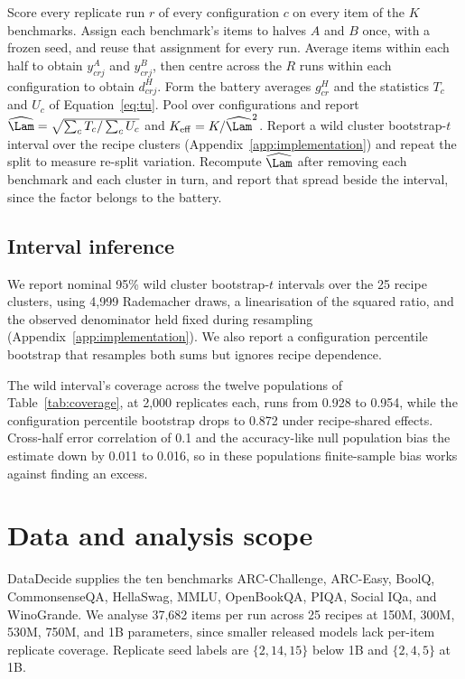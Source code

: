 \begin{algorithm}[t]
\caption{SNAP measurement recipe for a fixed battery of $K$ benchmarks scored on $R$ replicate runs per configuration. The primary analysis used a random frozen split, checked against a passage-aware one, and the pre-specified test kept passage-linked items in one half.}
\label{alg:snap}
\begin{algorithmic}[1]
\STATE Score every replicate run $r$ of every configuration $c$ on every item of the $K$ benchmarks.
\STATE Assign each benchmark's items to halves $A$ and $B$ once, with a frozen seed, and reuse that assignment for every run.
\STATE Average items within each half to obtain $y^A_{crj}$ and $y^B_{crj}$, then centre across the $R$ runs within each configuration to obtain $d^H_{crj}$.
\STATE Form the battery averages $g^H_{cr}$ and the statistics $T_c$ and $U_c$ of Equation~\ref{eq:tu}.
\STATE Pool over configurations and report $\widehat\Lam=\sqrt{\sum_c T_c/\sum_c U_c}$ and $K_{\mathrm{eff}}=K/\widehat\Lam^2$.
\STATE Report a wild cluster bootstrap-$t$ interval over the recipe clusters (Appendix~\ref{app:implementation}) and repeat the split to measure re-split variation.
\STATE Recompute $\widehat\Lam$ after removing each benchmark and each cluster in turn, and report that spread beside the interval, since the factor belongs to the battery.
\end{algorithmic}
\end{algorithm}


\subsection{Interval inference}
We report nominal 95\% wild cluster bootstrap-$t$ intervals over the 25 recipe clusters, using 4,999 Rademacher draws, a linearisation of the squared ratio, and the observed denominator held fixed during resampling (Appendix~\ref{app:implementation}). We also report a configuration percentile bootstrap that resamples both sums but ignores recipe dependence.

The wild interval's coverage across the twelve populations of Table~\ref{tab:coverage}, at 2,000 replicates each, runs from 0.928 to 0.954, while the configuration percentile bootstrap drops to 0.872 under recipe-shared effects. Cross-half error correlation of 0.1 and the accuracy-like null population bias the estimate down by 0.011 to 0.016, so in these populations finite-sample bias works against finding an excess.

\section{Data and analysis scope}
\label{sec:data}
DataDecide supplies the ten benchmarks ARC-Challenge, ARC-Easy, BoolQ, CommonsenseQA, HellaSwag, MMLU, OpenBookQA, PIQA, Social IQa, and WinoGrande. We analyse 37,682 items per run across 25 recipes at 150M, 300M, 530M, 750M, and 1B parameters, since smaller released models lack per-item replicate coverage. Replicate seed labels are $\{2,14,15\}$ below 1B and $\{2,4,5\}$ at 1B.

